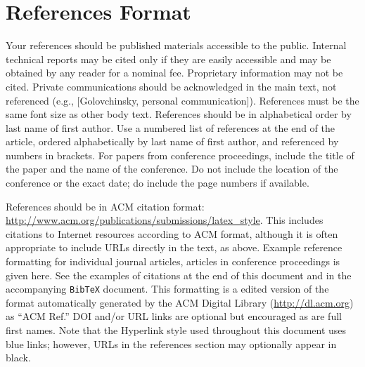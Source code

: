 \documentclass{sigchi}
\begin{document}
\section{References Format}
Your references should be published materials accessible to the
public. Internal technical reports may be cited only if they are
easily accessible and may be obtained by any reader for a nominal
fee. Proprietary information may not be cited. Private communications
should be acknowledged in the main text, not referenced (e.g.,
[Golovchinsky, personal communication]). References must be the same
font size as other body text. References should be in alphabetical
order by last name of first author. Use a numbered list of references
at the end of the article, ordered alphabetically by last name of
first author, and referenced by numbers in brackets. For papers from
conference proceedings, include the title of the paper and the name of
the conference. Do not include the location of the conference or the
exact date; do include the page numbers if available. 

References should be in ACM citation format:
\url{http://www.acm.org/publications/submissions/latex_style}.  This
includes citations to Internet
resources according to ACM format, although it is often appropriate to include
URLs directly in the text, as above. Example reference formatting for
individual journal articles, articles in conference
proceedings is given here.  See the examples of
citations at the end of this document and in the accompanying
\texttt{BibTeX} document. This formatting is a edited version of the
format automatically generated by the ACM Digital Library
(\url{http://dl.acm.org}) as ``ACM Ref.'' DOI and/or URL links are
optional but encouraged as are full first names. Note that the
Hyperlink style used throughout this document uses blue links;
however, URLs in the references section may optionally appear in
black.

\balance{}



\end{document}
